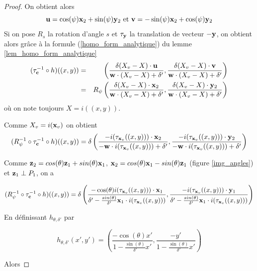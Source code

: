 \begin{proof}
On obtient alors
\begin{equation*}
\mathbf{u}=\cos(\psi)\mathbf{x}_{2}+\sin(\psi)\mathbf{y}_{2} \text{ et } \mathbf{v}=-\sin(\psi)\mathbf{x}_{2}+\cos(\psi)\mathbf{y}_{2}
\end{equation*}
Si on pose $R_{s}$ la rotation d'angle $s$ et $\tau_{\mathbf{y}}$ la translation de vecteur $-\mathbf{y}$, on obtient alors grâce à la formule (\ref{homo_form_analytique}) du lemme \ref{lem_homo_form_analytique}
\begin{eqnarray*}
(\tau_{\mathbf{c}}^{-1} \circ h)((x,y)) &=& \left(\frac{\delta (X_v-X)\cdot \mathbf{u} }{\mathbf{w} \cdot (X_v-X)+\delta'},\frac{\delta (X_v-X)\cdot \mathbf{v}}{\mathbf{w} \cdot (X_v-X)+\delta'}  \right) \\
                           &=& R_{\psi}\left(\frac{\delta (X_v-X)\cdot \mathbf{x}_{2} }{\mathbf{w} \cdot (X_v-X)+\delta'},\frac{\delta (X_v-X)\cdot \mathbf{y}_{2}}{\mathbf{w} \cdot (X_v-X)+\delta'}  \right) \\
\end{eqnarray*}
où on note toujours $X = i((x,y))$.

Comme $X_{v}=i(\mathbf{x}_v)$ on obtient
\begin{equation*}
(R_{\psi}^{-1} \circ \tau_{\mathbf{c}}^{-1}  \circ h)((x,y))=\delta \left(\frac{-i(\tau_{\mathbf{x}_v} ((x,y)))\cdot \mathbf{x}_{2} }{-\mathbf{w} \cdot i(\tau_{\mathbf{x}_v} ((x,y)))+\delta'},\frac{-i(\tau_{\mathbf{x}_v} ((x,y)))\cdot \mathbf{y}_{2}}{-\mathbf{w} \cdot i(\tau_{\mathbf{x}_v} ((x,y)))+\delta'}  \right) 
\end{equation*}

Comme $\mathbf{z}_{2}=cos(\theta)\mathbf{z}_{1}+sin(\theta)\mathbf{x}_{1}$, $\mathbf{x}_{2}=cos(\theta)\mathbf{x}_{1}-sin(\theta)\mathbf{z}_{1}$ (figure \ref{img_angles}) et $\mathbf{z}_{1}\perp P_{1}$, on a

\begin{equation*}
(R_{\psi}^{-1} \circ \tau_{\mathbf{c}}^{-1}  \circ h)((x,y))=\delta\left(\frac{-\cos(\theta)i(\tau_{\mathbf{x}_v} ((x,y)))\cdot \mathbf{x}_{1} }{\delta'-\frac{sin(\theta)}{\delta'}\mathbf{x}_{1}\cdot i(\tau_{\mathbf{x}_v}((x,y)))}, \frac{-i(\tau_{\mathbf{x}_v} ((x,y)))\cdot \mathbf{y}_{1}}{\delta'-\frac{sin(\theta)}{\delta'}\mathbf{x}_{1}\cdot i(\tau_{\mathbf{x}_v}((x,y)))}  \right) 
\end{equation*}

En définissant $h_{\theta,\delta'}$ par

\begin{equation*}
h_{\theta,\delta'}(x',y')=\left(\frac{-\cos(\theta)x'}{1-\frac{\sin(\theta)}{\delta'}x'} ,\frac{-y'}{1-\frac{\sin(\theta)}{\delta'}x'}\right)
\end{equation*}

Alors 


\end{proof}
